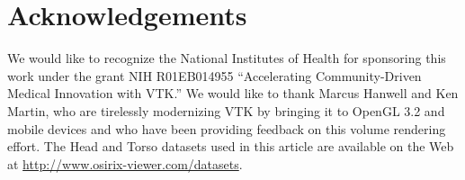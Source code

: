 \section{Acknowledgements}
We would like to recognize the National Institutes of Health for sponsoring this
work under the grant NIH R01EB014955 “Accelerating Community-Driven Medical
Innovation with VTK.” We would like to thank Marcus Hanwell and Ken Martin, who
are tirelessly modernizing VTK by bringing it to OpenGL 3.2 and mobile devices
and who have been providing feedback on this volume rendering effort.  The Head
and Torso datasets used in this article are available on the Web at
\url{http://www.osirix-viewer.com/datasets}.
